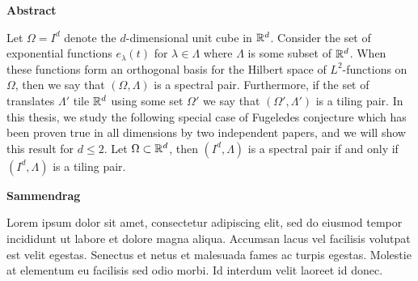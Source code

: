 





\begin{center}\textsf{\textbf{\large Abstract}}\end{center} 

Let $\Omega=I^d$ denote the $d$-dimensional unit cube in $\mathbb{R}^d$. Consider the set of exponential functions $e_\lambda(t)$ for $\lambda \in \Lambda$ where $\Lambda$ is some subset of $\mathbb{R}^d$. When these functions form an orthogonal basis for the Hilbert space of $L^2$-functions on $\Omega$, then we say that $(\Omega,\Lambda)$ is a spectral pair. Furthermore, if the set of translates $\Lambda'$ tile $\mathbb{R}^d$ using some set $\Omega'$ we say that $(\Omega',\Lambda')$ is a tiling pair. In this thesis, we study the following special case of Fugeledes conjecture which has been proven true in all dimensions by two independent papers, and we will show this result for $d\leq2$. Let $\Omega\subset\mathbb{R}^d$, then $(I^d,\Lambda)$ is a spectral pair if and only if $(I^d,\Lambda)$ is a tiling pair.

\begin{center}\textsf{\textbf{\large Sammendrag}}\end{center} 

Lorem ipsum dolor sit amet, consectetur adipiscing elit, sed do eiusmod tempor incididunt ut labore et dolore magna aliqua. Accumsan lacus vel facilisis volutpat est velit egestas. Senectus et netus et malesuada fames ac turpis egestas. Molestie at elementum eu facilisis sed odio morbi. Id interdum velit laoreet id donec.


 